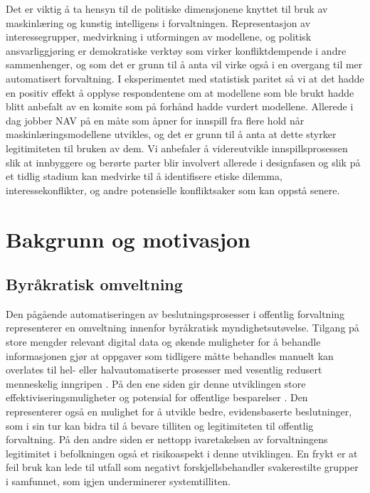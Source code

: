 \documentclass[
  12pt,
  a4paper, 12pt]{article}
\begin{document}
Det er viktig å ta hensyn til de politiske dimensjonene knyttet til bruk av maskinlæring og kunstig intelligens i forvaltningen.
Representasjon av interessegrupper, medvirkning i utformingen av modellene, og politisk ansvarliggjøring er demokratiske verktøy som virker konfliktdempende i andre sammenhenger, og som det er grunn til å anta vil virke også i en overgang til mer automatisert forvaltning.
I eksperimentet med statistisk paritet så vi at det hadde en positiv effekt å opplyse respondentene om at modellene som ble brukt hadde blitt anbefalt av en komite som på forhånd hadde vurdert modellene.
Allerede i dag jobber NAV på en måte som åpner for innspill fra flere hold når maskinlæringsmodellene utvikles, og det er grunn til å anta at dette styrker legitimiteten til bruken av dem.
Vi anbefaler å videreutvikle innspillsprosessen slik at innbyggere og berørte parter blir involvert allerede i designfasen og slik på et tidlig stadium kan medvirke til å identifisere etiske dilemma, interessekonflikter, og andre potensielle konfliktsaker som kan oppstå senere.

\doublespacing

\newpage\doublespacing

\hypertarget{bakgrunn}{%
\section{Bakgrunn og motivasjon}\label{bakgrunn}}

\hypertarget{byruxe5kratisk-omveltning}{%
\subsection{Byråkratisk omveltning}\label{byruxe5kratisk-omveltning}}

Den pågående automatiseringen av beslutningsprosesser i offentlig forvaltning representerer en omveltning innenfor byråkratisk myndighetsutøvelse.
Tilgang på store mengder relevant digital data og økende muligheter for å behandle informasjonen gjør at oppgaver som tidligere måtte behandles manuelt kan overlates til hel- eller halvautomatiserte prosesser med vesentlig redusert menneskelig inngripen \citep{zarsky2016trouble}.
På den ene siden gir denne utviklingen store effektiviseringsmuligheter og potensial for offentlige besparelser \citep{duwe2017effects}.
Den representerer også en mulighet for å utvikle bedre, evidensbaserte beslutninger, som i sin tur kan bidra til å bevare tilliten og legitimiteten til offentlig forvaltning.
På den andre siden er nettopp ivaretakelsen av forvaltningens legitimitet i befolkningen også et risikoaspekt i denne utviklingen.
En frykt er at feil bruk kan lede til utfall som negativt forskjellsbehandler svakerestilte grupper i samfunnet, som igjen underminerer systemtilliten.
\end{document}
